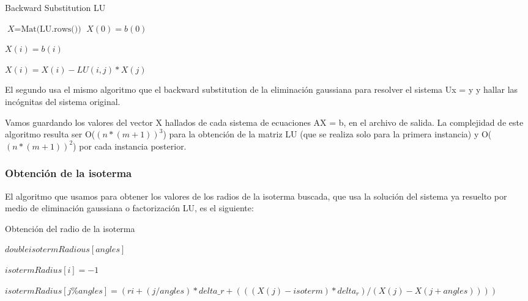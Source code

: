 \begin{algorithm}
\caption{Backward Substitution LU}\label{euclid}
\begin{algorithmic}[1]


    \State $\textit{X} = \text{Mat(LU.rows())}$
    \State $X(0) = b(0)$

      \State $X(i) = b(i)$

        \State $X(i) = X(i) - LU(i,j)*X(j)$
      \EndFor

    \EndFor
      
  \EndFunction

\end{algorithmic}
\end{algorithm}

El segundo usa el mismo algoritmo que el backward substitution de la eliminación gaussiana para resolver el sistema Ux = y y hallar las incógnitas del sistema original. 

Vamos guardando los valores del vector X hallados de cada sistema de ecuaciones AX = b, en el archivo de salida. La complejidad de este algoritmo resulta ser O($(n*(m+1))^{3}$) para la obtención de la matriz LU (que se realiza solo para la primera instancia) y O($(n*(m+1))^{2}$)
por cada instancia posterior.


\subsubsection{Obtención de la isoterma}

El algoritmo que usamos para obtener los valores de los radios de la isoterma buscada, que usa la solución del sistema ya resuelto por medio de eliminación gaussiana o factorización LU, es el siguiente:

\begin{algorithm}
\caption{Obtención del radio de la isoterma}\label{euclid}
\begin{algorithmic}[1]



    \State $double isotermRadious[angles]$

      \State $isotermRadius[i] = -1$
    \EndFor

       \State $isotermRadius[j \% angles] = (ri + (j / angles)*delta\_r + (((X(j) - isoterm) * delta_r)/ (X(j) - X(j+angles)) ))$
      \EndIf
    \EndFor

  \EndFunction

\end{algorithmic}
\end{algorithm}

